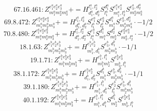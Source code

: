 \documentclass[letterpaper,10pt,fleqn,leqno,onecolumn]{article}
\begin{document}
\begin{equation} \;\;\;\;\;\;  67.16.461: Z^{e_{1}^{a}e_{2}^{a}e_{3}^{a}}_{m_{1}^{a}m_{2}^{a}m_{3}^{a}}+=H^{l_{1}^{a},l_{2}^{a}}_{d_{1}^{a},d_{2}^{a}}S^{d_{1}^{a}}_{l_{1}^{a}}S^{e_{1}^{a}e_{2}^{a}}_{m_{1}^{a},l_{2}^{a}}S^{e_{3}^{a},d_{2}^{a}}_{m_{2}^{a}m_{3}^{a}} \end{equation}
\begin{equation} \;\;\;\;\;\;  69.8.472: Z^{e_{1}^{a}e_{2}^{a}e_{3}^{a}}_{m_{1}^{a}m_{2}^{a}m_{3}^{a}}+=H^{l_{1}^{a},l_{2}^{a}}_{d_{1}^{a},d_{2}^{a}}S^{e_{1}^{a}}_{l_{1}^{a}}S^{e_{2}^{a}}_{l_{2}^{a}}S^{d_{1}^{a}}_{m_{1}^{a}}S^{e_{3}^{a},d_{2}^{a}}_{m_{2}^{a}m_{3}^{a}}\cdot -1/2 \end{equation}
\begin{equation} \;\;\;\;\;\;  70.8.480: Z^{e_{1}^{a}e_{2}^{a}e_{3}^{a}}_{m_{1}^{a}m_{2}^{a}m_{3}^{a}}+=H^{l_{1}^{a},l_{2}^{a}}_{d_{1}^{a},d_{2}^{a}}S^{e_{1}^{a}}_{l_{1}^{a}}S^{d_{1}^{a}}_{m_{1}^{a}}S^{d_{2}^{a}}_{m_{2}^{a}}S^{e_{2}^{a}e_{3}^{a}}_{m_{3}^{a},l_{2}^{a}}\cdot -1/2 \end{equation}
\begin{equation} \;\;\;\;\;\;  18.1.63: Z^{e_{1}^{b}e_{2}^{b}e_{3}^{b}}_{m_{1}^{b}m_{2}^{b}m_{3}^{b}}+=H^{e_{1}^{b}e_{2}^{b}}_{m_{1}^{b},d_{1}^{b}}S^{e_{3}^{b},d_{1}^{b}}_{m_{2}^{b}m_{3}^{b}}\cdot -1/1 \end{equation}
\begin{equation} \;\;\;\;\;\;  19.1.71: Z^{e_{1}^{b}e_{2}^{b}e_{3}^{b}}_{m_{1}^{b}m_{2}^{b}m_{3}^{b}}+=H^{e_{1}^{b},l_{1}^{b}}_{m_{1}^{b}m_{2}^{b}}S^{e_{2}^{b}e_{3}^{b}}_{m_{3}^{b},l_{1}^{b}} \end{equation}
\begin{equation} \;\;\;\;\;\;  38.1.172: Z^{e_{1}^{b}e_{2}^{b}e_{3}^{b}}_{m_{1}^{b}m_{2}^{b}m_{3}^{b}}+=H^{e_{1}^{b}e_{2}^{b}}_{d_{1}^{b},d_{2}^{b}}S^{d_{1}^{b}}_{m_{1}^{b}}S^{e_{3}^{b},d_{2}^{b}}_{m_{2}^{b}m_{3}^{b}}\cdot -1/1 \end{equation}
\begin{equation} \;\;\;\;\;\;  39.1.180: Z^{e_{1}^{b}e_{2}^{b}e_{3}^{b}}_{m_{1}^{b}m_{2}^{b}m_{3}^{b}}+=H^{e_{1}^{b},l_{1}^{b}}_{m_{1}^{b},d_{1}^{b}}S^{e_{2}^{b}}_{l_{1}^{b}}S^{e_{3}^{b},d_{1}^{b}}_{m_{2}^{b}m_{3}^{b}} \end{equation}
\begin{equation} \;\;\;\;\;\;  40.1.192: Z^{e_{1}^{b}e_{2}^{b}e_{3}^{b}}_{m_{1}^{b}m_{2}^{b}m_{3}^{b}}+=H^{e_{1}^{b},l_{1}^{b}}_{m_{1}^{b},d_{1}^{b}}S^{d_{1}^{b}}_{m_{2}^{b}}S^{e_{2}^{b}e_{3}^{b}}_{m_{3}^{b},l_{1}^{b}} \end{equation}
\end{document}
